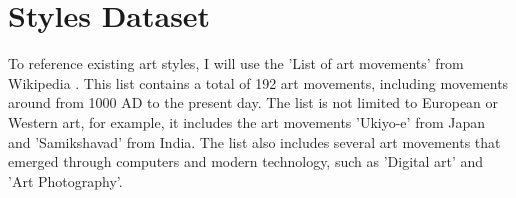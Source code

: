 




\section{Styles Dataset}
\label{cha:Styles Dataset}

To reference existing art styles, I will use the 'List of art movements' from Wikipedia \autocite{wikipedia-styles}. This list contains a total of 192 art movements, including movements around from 1000 AD to the present day. The list is not limited to European or Western art, for example, it includes the art movements 'Ukiyo-e' from Japan and 'Samikshavad' from India. The list also includes several art movements that emerged through computers and modern technology, such as 'Digital art' and 'Art Photography'.


